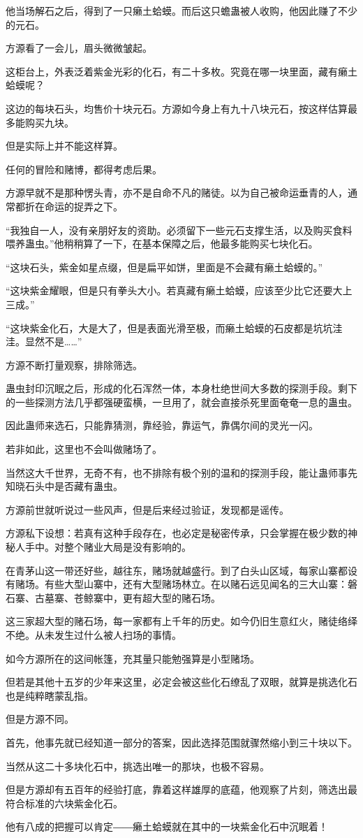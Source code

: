 \begin{this_body}
他当场解石之后，得到了一只癞土蛤蟆。而后这只蟾蛊被人收购，他因此赚了不少的元石。

方源看了一会儿，眉头微微皱起。

这柜台上，外表泛着紫金光彩的化石，有二十多枚。究竟在哪一块里面，藏有癞土蛤蟆呢？

这边的每块石头，均售价十块元石。方源如今身上有九十八块元石，按这样估算最多能购买九块。

但是实际上并不能这样算。

任何的冒险和赌博，都得考虑后果。

方源早就不是那种愣头青，亦不是自命不凡的赌徒。以为自己被命运垂青的人，通常都折在命运的捉弄之下。

“我独自一人，没有亲朋好友的资助。必须留下一些元石支撑生活，以及购买食料喂养蛊虫。”他稍稍算了一下，在基本保障之后，他最多能购买七块化石。

“这块石头，紫金如星点缀，但是扁平如饼，里面是不会藏有癞土蛤蟆的。”

“这块紫金耀眼，但是只有拳头大小。若真藏有癞土蛤蟆，应该至少比它还要大上三成。”

“这块紫金化石，大是大了，但是表面光滑至极，而癞土蛤蟆的石皮都是坑坑洼洼。显然不是……”

方源不断打量观察，排除筛选。

蛊虫封印沉眠之后，形成的化石浑然一体，本身杜绝世间大多数的探测手段。剩下的一些探测方法几乎都强硬蛮横，一旦用了，就会直接杀死里面奄奄一息的蛊虫。

因此蛊师来选石，只能靠猜测，靠经验，靠运气，靠偶尔间的灵光一闪。

若非如此，这里也不会叫做赌场了。

当然这大千世界，无奇不有，也不排除有极个别的温和的探测手段，能让蛊师事先知晓石头中是否藏有蛊虫。

方源前世就听说过一些风声，但是后来经过验证，发现都是谣传。

方源私下设想：若真有这种手段存在，也必定是秘密传承，只会掌握在极少数的神秘人手中。对整个赌业大局是没有影响的。

在青茅山这一带还好些，越往东，赌场就越盛行。到了白头山区域，每家山寨都设有赌场。有些大型山寨中，还有大型赌场林立。在以赌石远见闻名的三大山寨：磐石寨、古墓寨、苍鲸寨中，更有超大型的赌石场。

这三家超大型的赌石场，每一家都有上千年的历史。如今仍旧生意红火，赌徒络绎不绝。从未发生过什么被人扫场的事情。

如今方源所在的这间帐篷，充其量只能勉强算是小型赌场。

但若是其他十五岁的少年来这里，必定会被这些化石缭乱了双眼，就算是挑选化石也是纯粹瞎蒙乱指。

但是方源不同。

首先，他事先就已经知道一部分的答案，因此选择范围就骤然缩小到三十块以下。

当然从这二十多块化石中，挑选出唯一的那块，也极不容易。

但是方源却有五百年的经验打底，靠着这样雄厚的底蕴，他观察了片刻，筛选出最符合标准的六块紫金化石。

他有八成的把握可以肯定――癞土蛤蟆就在其中的一块紫金化石中沉眠着！

\end{this_body}

